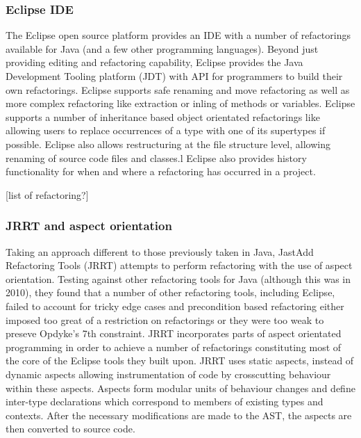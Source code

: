 \subsubsection{Eclipse IDE}
The Eclipse open source platform provides an IDE with a number of refactorings available for Java (and a few other programming languages). Beyond just providing editing and refactoring capability, Eclipse provides the Java Development Tooling platform (JDT) with API for programmers to build their own refactorings. Eclipse supports safe renaming and move refactoring as well as more complex refactoring like extraction or inling of methods or variables. Eclipse supports a number of inheritance based object orientated refactorings like allowing users to replace occurrences of a type with one of its supertypes if possible. Eclipse also allows restructuring at the file structure level, allowing renaming of source code files and classes.l Eclipse also provides history functionality for when and where a refactoring has occurred in a project. 

[list of refactoring?]

\subsubsection{JRRT and aspect orientation}
Taking an approach different to those previously taken in Java, JastAdd Refactoring Tools (JRRT) attempts to perform refactoring with the use of aspect orientation. Testing against other refactoring tools for Java (although this was in 2010), they found that a number of other refactoring tools, including Eclipse, failed to account for tricky edge cases and precondition based refactoring either imposed too great of a restriction on refactorings or they were too weak to preseve Opdyke's 7th constraint. JRRT incorporates parts of aspect orientated programming in order to achieve a number of refactorings constituting most of the core of the Eclipse tools they built upon. JRRT uses static aspects, instead of dynamic aspects allowing instrumentation of code by crosscutting behaviour within these aspects. Aspects form modular units of behaviour changes and define inter-type declarations which correspond to members of existing types and contexts. After the necessary modifications are made to the AST, the aspects are then converted to source code.

